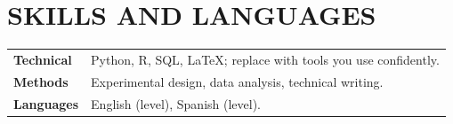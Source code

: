 \section{SKILLS AND LANGUAGES}
\begin{tabularx}{\linewidth}{@{}lX@{}}
\textbf{Technical} & Python, R, SQL, LaTeX; replace with tools you use confidently.\\[3pt]
\textbf{Methods} & Experimental design, data analysis, technical writing.\\[3pt]
\textbf{Languages} & English (level), Spanish (level).\\
\end{tabularx}
